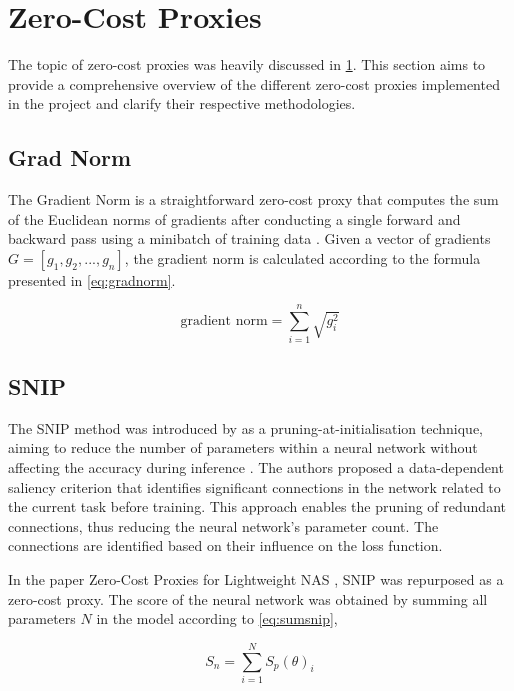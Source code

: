 \section{Zero-Cost Proxies}\label{zcproxies}

The topic of zero-cost proxies was heavily discussed in \cref{zcproxies}. This section aims to provide a comprehensive overview of the different zero-cost proxies implemented in the project and clarify their respective methodologies.

\subsection{Grad Norm}
The Gradient Norm is a straightforward zero-cost proxy that computes the sum of the Euclidean norms of gradients after conducting a single forward and backward pass using a minibatch of training data \autocite{abdelfattah2021zero}. Given a vector of gradients \(G = [g_1, g_2, ..., g_n]\), the gradient norm is calculated according to the formula presented in \cref{eq:gradnorm}.

\begin{equation}\label{eq:gradnorm}
\text{gradient norm} = \sum_{i=1}^n \sqrt{g_i^2}
\end{equation}

\subsection{SNIP}
The \gls{SNIP} method was introduced by \autocite{lee2018snip} as a pruning-at-initialisation technique, aiming to reduce the number of parameters within a neural network without affecting the accuracy during inference \autocite{frankle2020pruning}. The authors proposed a data-dependent saliency criterion that identifies significant connections in the network related to the current task before training. This approach enables the pruning of redundant connections, thus reducing the neural network's parameter count. The connections are identified based on their influence on the loss function.

\noindent In the paper Zero-Cost Proxies for Lightweight NAS \autocite{abdelfattah2021zero}, SNIP was repurposed as a zero-cost proxy. The score of the neural network was obtained by summing all parameters $N$ in the model according to \cref{eq:sumsnip},

\begin{equation}\label{eq:sumsnip}
S_n = \sum_{i=1}^N S_p(\theta)_i
\end{equation}

